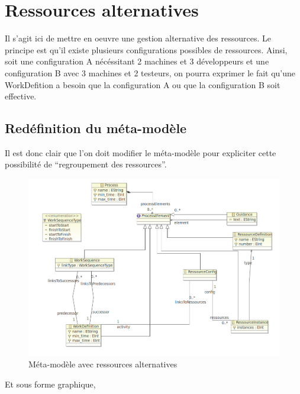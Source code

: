 \section{Ressources alternatives}

Il s'agit ici de mettre en oeuvre une gestion alternative des ressources. Le principe est qu'il existe plusieurs configurations possibles de ressources.
Ainsi, soit une configuration A nécéssitant 2 machines et 3 développeurs et une configuration B avec 3 machines et 2 testeurs, on pourra exprimer le fait qu'une WorkDefition a besoin que la configuration A ou que la configuration B soit effective.

\subsection{Redéfinition du méta-modèle}

Il est donc clair que l'on doit modifier le méta-modèle pour expliciter cette possibilité de ``regroupement des ressources''.

\begin{figure}[!h] 
\begin{center}
\includegraphics[width=15cm]{Capture-13.png}
\caption{Méta-modèle avec ressources alternatives} 
\label{img1} 
\end{center}
\end{figure} 

Et sous forme graphique,\\

\newpage


